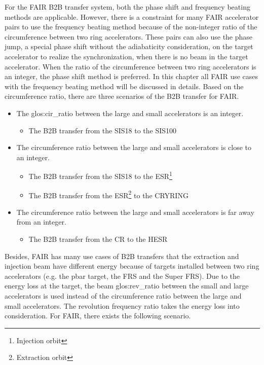 For the FAIR B2B transfer system, both the phase shift and frequency beating methods are applicable. However, there is a constraint for many FAIR accelerator pairs to use the frequency beating method because of the non-integer ratio of the circumference between two ring accelerators. These pairs can also use the phase jump, a special phase shift without the adiabaticity consideration, on the target accelerator to realize the synchronization, when there is no beam in the target accelerator.  When the ratio of the circumference between two ring accelerators is an integer, the phase shift method is preferred. In this chapter all FAIR use cases with the frequency beating method will be discussed in details. Based on the circumference ratio, there are three scenarios of the B2B transfer for FAIR. 
\begin{itemize}
	\item The \gls{glos:cir_ratio} between the large and small accelerators is an integer.
		\begin{itemize}
			\item	The B2B transfer from the SIS18 to the SIS100

		\end{itemize}
	\item The circumference ratio between the large and small accelerators is close to an integer.
		\begin{itemize}
			\item The B2B transfer from the SIS18 to the ESR\footnote{Injection orbit}
			\item The B2B transfer from the ESR\footnote{Extraction orbit} to the CRYRING
		\end{itemize}
 	\item The circumference ratio between the large and small accelerators is far away from an integer.
		\begin{itemize}
			\item The B2B transfer from the CR to the HESR
		\end{itemize}
\end{itemize}
Besides, FAIR has many use cases of B2B transfers that the extraction and injection beam have different energy because of targets installed between two ring accelerators (e.g. the pbar target, the FRS and the Super FRS). Due to the energy loss at the target, the beam \gls{glos:rev_ratio} between the small and large accelerators is used instead of the circumference ratio between the large and small accelerators. The revolution frequency ratio takes the energy loss into consideration. For FAIR, there exists the following scenario.

